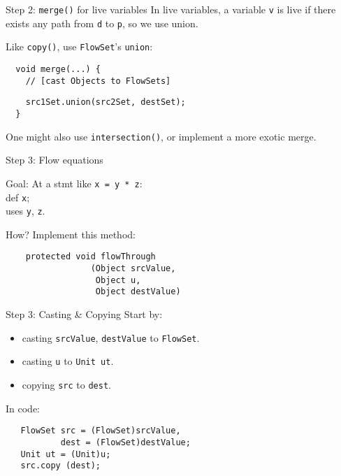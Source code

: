 \begin{slide}{Step 2: {\tt merge()} for live variables}
In live variables, a variable {\tt v} is live if there exists {\red any} path
from {\tt d} to {\tt p}, so we use {\red union}.

\qquad

Like {\tt copy()}, use {\tt FlowSet}'s {\tt union}:

\vspace*{0.05in}

\begin{verbatim}
  void merge(...) {
    // [cast Objects to FlowSets]
\end{verbatim}
{\red\verb+    src1Set.union(src2Set, destSet);+}\\
\verb+  }+

\vspace*{0.1in}

One might also use {\tt intersection()}, or implement a more exotic merge.

\end{slide}

\begin{slide}{Step 3: Flow equations}
\vspace*{-0.1in}

Goal: At a stmt like {\tt x = y * z}:\\
\qquad \qquad {\red -- } def {\tt x};\\
\qquad \qquad {\red + } uses {\tt y}, {\tt z}.

\vspace*{0.1in}

How? Implement this method:
\begin{verbatim}
    protected void flowThrough
                 (Object srcValue, 
                  Object u, 
                  Object destValue)
\end{verbatim}
\end{slide}

\begin{slide}{Step 3: Casting \& Copying}
Start by:
\begin{itemize}
\item casting {\tt srcValue}, {\tt destValue} to {\tt FlowSet}.

\item casting {\tt u} to {\tt Unit ut}.

\item copying {\tt src} to {\tt dest}.
\end{itemize}

In code:

\begin{verbatim}
   FlowSet src = (FlowSet)srcValue,
           dest = (FlowSet)destValue;
   Unit ut = (Unit)u;
   src.copy (dest);
\end{verbatim}
\end{slide}

